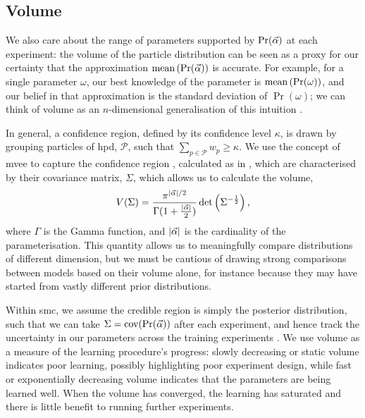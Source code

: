 \subsection{Volume}\label{sec:volume}
We also care about the range of parameters supported by $\Pr(\vec{\alpha})$ at each experiment: 
    the \gls{volume} of the particle distribution can be seen as a proxy for our certainty
    that the approximation $\textrm{mean}\left(\Pr(\vec{\alpha})\right) $ is accurate. 
For example, for a single parameter $\omega$, our best knowledge of the parameter is $\textrm{mean}\left( \Pr(\omega) \right)$, 
    and our belief in that approximation is the standard deviation of $\Pr(\omega)$; 
    we can think of volume as an $n$-dimensional generalisation of this intuition \cite{qinfer-1_0, ferrie2014high}. 
\par 
In general, a confidence region, defined by its confidence level $\kappa$, is drawn by grouping particles 
    of \gls{hpd}, $\mathcal{P}$, such that $\sum\limits_{p \in \mathcal{P}} w_{p} \geq \kappa$.
We use the concept  of \gls{mvee} 
    to capture the confidence region \cite{ferrie2014high}, calculated as in \cite{todd2007khachiyan}, 
    which are characterised by their covariance matrix, $\Sigma$, which allows us to calculate the \gls{volume}, 
    \begin{equation}
        \label{eqn:volume}
        V(\Sigma) = \frac{ \pi^{| \vec{\alpha} | / 2}}{ \Gamma(1 + \frac{| \vec{\alpha} |}{2})} \det\left(\Sigma^{-\frac{1}{2}}\right),
    \end{equation}
    where $\Gamma$ is the Gamma function, and $|\vec{\alpha}|$ is the cardinality of the parameterisation. 
This quantity allows us to meaningfully compare distributions of different dimension, 
    but we must be cautious of drawing strong comparisons between models based on 
    their volume alone, for instance because they may have started from vastly different prior distributions. 
\par 

Within \gls{smc}, we assume the credible region is simply the posterior distribution, 
    such that we can take $\Sigma = \textrm{cov}(\Pr(\vec{\alpha}))$ after each experiment, 
    and hence track the uncertainty in our parameters across the training experiments \cite{Granade:2012kj}.
We use volume as a measure of the learning procedure's progress: 
    slowly decreasing or static volume indicates poor learning, possibly highlighting poor experiment design, 
    while fast or exponentially decreasing volume indicates that the parameters are being learned well. 
When the volume has converged, the learning has saturated and there is little benefit to running further experiments. 

